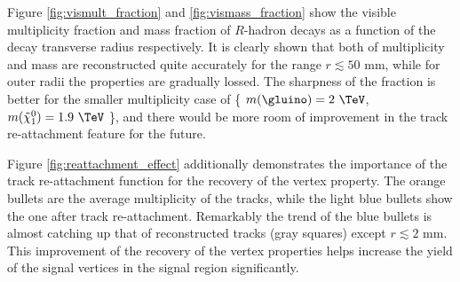 \documentclass[NOTE, atlasdraft=true, texlive=2018, UKenglish]{\ATLASLATEXPATH atlasdoc}
\begin{document}
Figure \ref{fig:vismult_fraction} and \ref{fig:vismass_fraction} show the visible multiplicity fraction and mass fraction of $R$-hadron decays as a function of the decay transverse radius respectively. It is clearly shown that both of multiplicity and mass are reconstructed quite accurately for the range $r\lesssim 50$ mm, while for outer radii the properties are gradually lossed. The sharpness of the fraction is better for the smaller multiplicity case of \{ $m(\gluino) = 2~\TeV$, $m(\tilde{\chi}_{1}^{0}) = 1.9~\TeV$ \}, and there would be more room of improvement in the track re-attachment feature for the future.

Figure \ref{fig:reattachment_effect} additionally demonstrates the importance of the track re-attachment function for the recovery of the vertex property. The orange bullets are the average multiplicity of the tracks, while the light blue bullets show the one after track re-attachment. Remarkably the trend of the blue bullets is almost catching up that of reconstructed tracks (gray squares) except $r\lesssim 2$ mm. This improvement of the recovery of the vertex properties helps increase the yield of the signal vertices in the signal region significantly.
\end{document}
